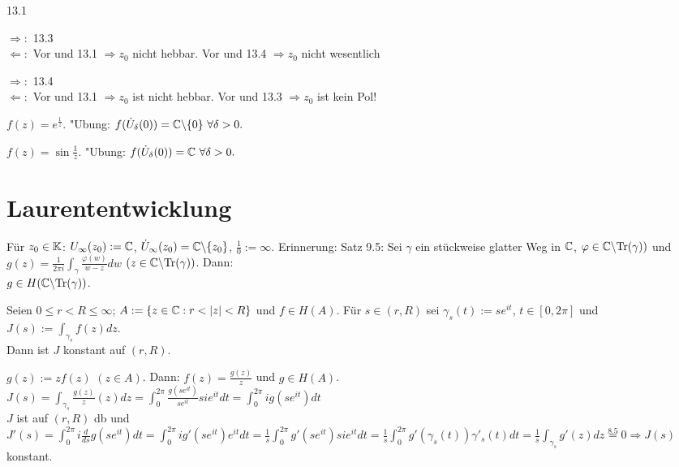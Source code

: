 \documentclass[a4paper,twoside,DIV15,BCOR12mm]{scrbook}
\begin{document}
\begin{beweis}
\begin{liste}
\item 13.1
\item $\Rightarrow:$ 13.3\\
$\Leftarrow:$ Vor und 13.1 $\Rightarrow z_0$ nicht hebbar. Vor und 13.4 $\Rightarrow z_0$ nicht wesentlich
\item $\Rightarrow:$ 13.4\\
$\Leftarrow:$ Vor und 13.1 $\Rightarrow z_0$ ist nicht hebbar. Vor und 13.3 $\Rightarrow z_0$ ist kein Pol!
\end{liste}
\end{beweis}

\begin{beispiele}
\begin{liste}
\item $f(z) = e^{\frac1z}.$ "Ubung: $f(\dot{U}_{\delta}(0)) = \mathbb{C} \backslash \{0\} \ \forall \delta > 0.$
\item $f(z) = \sin \frac1z$. "Ubung: $f(\dot{U}_{\delta}(0)) = \MdC \ \forall \delta > 0.$
\end{liste}
\end{beispiele}

\chapter{Laurententwicklung}

Für $z_0 \in \mathbb{K}$: $U_\infty(z_0) := \mathbb{C}$, $\dot{U}_\infty(z_0) = \mathbb{C} \backslash \{z_0\}$, 
$\frac{1}{0} := \infty$. Erinnerung: Satz 9.5: Sei $\gamma$ ein stückweise glatter Weg in $\mathbb{C}$, 
$\varphi \in \mathbb{C} \backslash \text{Tr}(\gamma))$ und $g(z) = \frac{1}{2 \pi i}\int_{\gamma}\frac{\varphi(w)}{w-z}dw$ 
$(z \in  \mathbb{C} \backslash \text{Tr}(\gamma) )$. Dann: \\
$g \in H( \mathbb{C} \backslash \text{Tr}(\gamma))$.

\begin{satz}
  Seien $ 0 \le r < R \le \infty$; $A := \{ z \in \mathbb{C} : r < |z| < R \}$ und $f \in H(A)$. Für $s \in (r,R)$ sei 
  $\gamma_s(t) := se^{it}$, $t \in [0,2 \pi ]$ und $J(s) := \int_{\gamma_s} f(z) dz$. \\
  Dann ist $J$ konstant auf $(r, R)$.
\end{satz}

\begin{beweis} 
  $g(z) := z f(z)$  $(z \in A)$. Dann: 
  $f(z) = \frac{g(z)}{z}$ und $g \in H(A)$. \\
  $J(s) = \int_{\gamma_s} \frac{g(z)}{z}(z) dz = \int_0^{2 \pi} \frac{g(se^{it})}{se^{it}}sie^{it} dt =  
  \int_0^{2 \pi} ig(se^{it}) dt$\\
  $J$ ist auf $(r,R)$ db und $J'(s) = \int_0^{2 \pi} i \frac{d}{ds}g(se^{it}) dt = \int_0^{2 \pi} i g'(se^{it})e^{it}  dt = 
  \frac{1}{s} \int_0^{2 \pi} g'(se^{it})sie^{it}  dt =  \frac{1}{s} \int_0^{2 \pi} g'(\gamma_s(t))\gamma'_s(t) dt =
  \frac{1}{s} \int_{\gamma_s} g'(z) dz \stackrel{8.5}{=} 0 \Rightarrow J(s)$ konstant.
\end{beweis}
\end{document}
